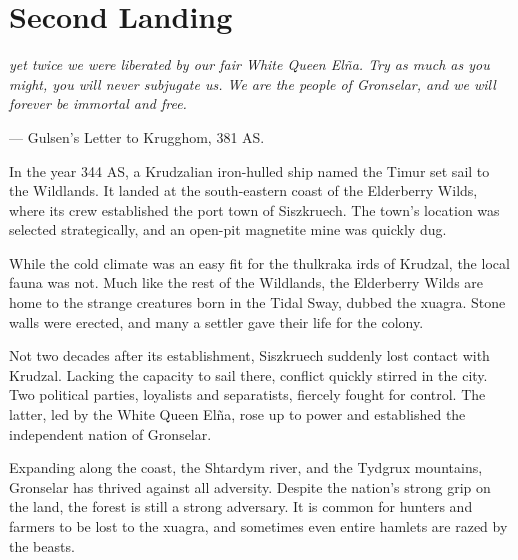 
\section{Second Landing}
\begin{linenumbers}
\textit{yet twice we were liberated by our fair White Queen El\~na.
Try as much as you might, you will never subjugate us.
We are the people of Gronselar, and we will forever be immortal and free.}

\hspace*{\fill} --- Gulsen's Letter to Krugghom, 381 AS.

In the year 344 AS, a Krudzalian iron-hulled ship named the Timur set sail to the Wildlands.
It landed at the south-eastern coast of the Elderberry Wilds, where its crew established the port town of Siszkruech.
The town's location was selected strategically, and an open-pit magnetite mine was quickly dug.

While the cold climate was an easy fit for the thulkraka irds of Krudzal, the local fauna was not.
Much like the rest of the Wildlands, the Elderberry Wilds are home to the strange creatures born in the Tidal Sway, dubbed the xuagra.
Stone walls were erected, and many a settler gave their life for the colony.

Not two decades after its establishment, Siszkruech suddenly lost contact with Krudzal.
Lacking the capacity to sail there, conflict quickly stirred in the city.
Two political parties, loyalists and separatists, fiercely fought for control.
The latter, led by the White Queen El\~na, rose up to power and established the independent nation of Gronselar.

Expanding along the coast, the Shtardym river, and the Tydgrux mountains, Gronselar has thrived against all adversity.
Despite the nation's strong grip on the land, the forest is still a strong adversary.
It is common for hunters and farmers to be lost to the xuagra, and sometimes even entire hamlets are razed by the beasts.



\end{linenumbers}
